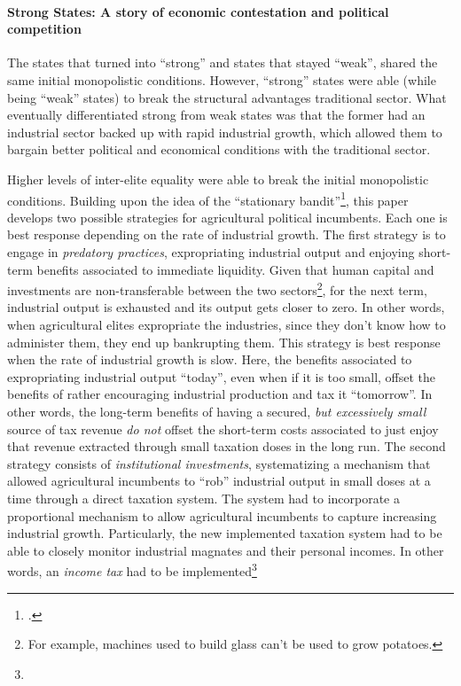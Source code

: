 \documentclass[onesided]{article}\usepackage[]{graphicx}\usepackage[]{color}
\begin{document}
\paragraph{Strong States: A story of economic contestation and political competition} The states that turned into ``strong'' and states that stayed ``weak'', shared the same initial monopolistic conditions. However, ``strong'' states were able (while being ``weak'' states) to break the structural advantages traditional sector.  What eventually differentiated strong from weak states was that the former had an industrial sector backed up with rapid industrial growth, which allowed them to bargain better political and economical conditions with the traditional sector.



Higher levels of inter-elite equality were able to break the initial monopolistic conditions. Building upon the idea of the ``stationary bandit''\footnote{\citet[]{Olson:2000aa}.}, this paper develops two possible strategies for agricultural political incumbents. Each one is best response depending on the rate of industrial growth. The first strategy is to engage in \emph{predatory practices}, expropriating industrial output and enjoying short-term benefits associated to immediate liquidity. Given that human capital and investments are non-transferable between the two sectors\footnote{For example, machines used to build glass can't be used to grow potatoes.}, for the next term, industrial output is exhausted and its output gets closer to zero. In other words, when agricultural elites expropriate the industries, since they don't know how to administer them, they end up bankrupting them. This strategy is best response when the rate of industrial growth is slow. Here, the benefits associated to expropriating industrial output ``today'', even when if it is too small, offset the benefits of rather encouraging industrial production and tax it ``tomorrow''. In other words, the long-term benefits of having a secured, \emph{but excessively small} source of tax revenue \emph{do not} offset the short-term costs associated to just enjoy that revenue extracted through small taxation doses in the long run. The second strategy consists of \emph{institutional investments}, systematizing a mechanism that allowed agricultural incumbents to ``rob'' industrial output in small doses at a time through a direct taxation system. The system had to incorporate a proportional mechanism to allow agricultural incumbents to capture increasing industrial growth. Particularly, the new implemented taxation system had to be able to closely monitor industrial magnates and their personal incomes. In other words, an \emph{income tax} had to be implemented\footnote{
}
\end{document}
